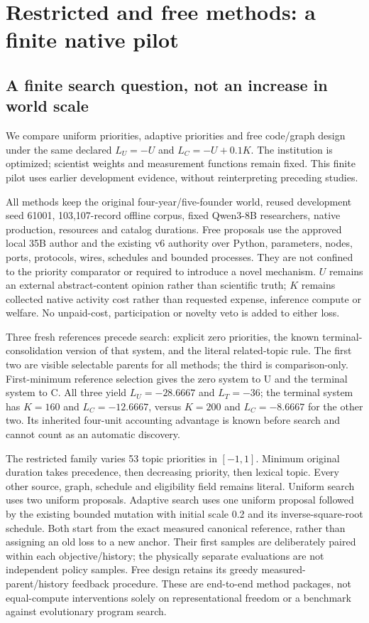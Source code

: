\section{Restricted and free methods: a finite native pilot}
\label{sec:native-priority-method-snapshot}

\subsection{A finite search question, not an increase in world scale}
We compare uniform priorities, adaptive priorities and free code/graph design
under the same declared $L_U=-U$ and $L_C=-U+0.1K$. The institution is optimized;
scientist weights and measurement functions remain fixed. This finite pilot
uses earlier development evidence, without reinterpreting preceding studies.

All methods keep the original four-year/five-founder world, reused development
seed 61001, 103,107-record offline corpus, fixed Qwen3-8B researchers, native
production, resources and catalog durations. Free proposals use the approved
local 35B author and the existing v6 authority over Python, parameters, nodes,
ports, protocols, wires, schedules and bounded processes. They are not confined
to the priority comparator or required to introduce a novel mechanism.
$U$ remains an external abstract-content opinion rather than scientific truth;
$K$ remains collected native activity cost rather than requested expense,
inference compute or welfare. No unpaid-cost, participation or novelty veto
is added to either loss.

Three fresh references precede search: explicit zero priorities, the known
terminal-consolidation version of that system, and the literal related-topic
rule. The first two are visible selectable parents for all methods; the third
is comparison-only. First-minimum reference selection gives the zero system
to U and the terminal system to C. All three yield $L_U=-28.6667$ and $L_T=-36$;
the terminal system has $K=160$ and $L_C=-12.6667$, versus $K=200$ and
$L_C=-8.6667$ for the other two. Its inherited four-unit accounting advantage
is known before search and cannot count as an automatic discovery.

The restricted family varies 53 topic priorities in $[-1,1]$. Minimum original
duration takes precedence, then decreasing priority, then lexical topic.
Every other source, graph, schedule and eligibility field remains literal.
Uniform search uses two uniform proposals. Adaptive search uses one uniform
proposal followed by the existing bounded mutation with initial scale 0.2
and its inverse-square-root schedule. Both start from the exact measured
canonical reference, rather than assigning an old loss to a new anchor.
Their first samples are deliberately paired within each objective/history;
the physically separate evaluations are not independent policy samples.
Free design retains its greedy measured-parent/history feedback procedure.
These are end-to-end method packages, not equal-compute interventions solely
on representational freedom or a benchmark against evolutionary program search.

